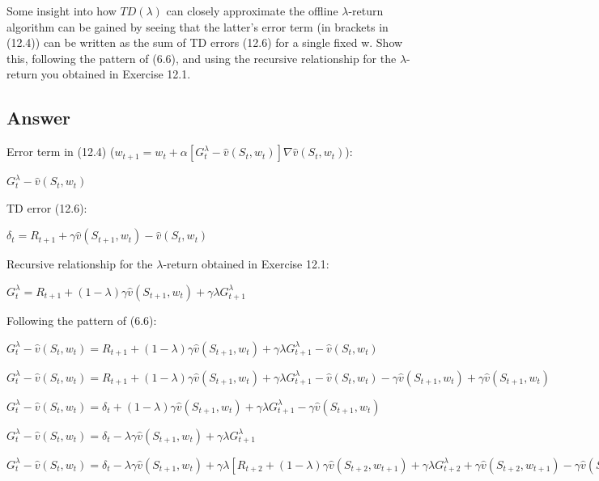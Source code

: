 \documentclass[11pt]{article}
\begin{document}
    Some insight into how $ TD(\lambda) $ can closely approximate the offline $\lambda$-return algorithm can be gained by seeing that the latter’s error term (in brackets in (12.4)) can be written as the sum of TD errors (12.6) for a single fixed w.
    Show this, following the pattern of (6.6), and using the recursive relationship for the $\lambda$-return you obtained in Exercise 12.1.

    \subsection*{Answer}

    \noindent Error term in (12.4) ($ w_{t+1} = w_t + \alpha [G_{t}^{\lambda} - \hat{v}(S_t, w_t)]\nabla \hat{v}(S_t, w_t)  $):

    \noindent $ G_{t}^{\lambda} - \hat{v}(S_t, w_t) $

    \hfill \break
    \noindent TD error (12.6):

    \noindent $ \delta_t = R_{t+1} + \gamma \hat{v}(S_{t+1}, w_t) - \hat{v}(S_t,w_t) $

    \hfill \break
    \noindent Recursive relationship for the $\lambda$-return obtained in Exercise 12.1:

    \noindent $ G_{t}^\lambda =  R_{t+1} + (1-\lambda) \gamma \hat{v}(S_{t+1},w_{t}) +  \gamma \lambda G_{t+1}^\lambda $

    \hfill \break
    \noindent Following the pattern of (6.6):

    \noindent $ G_{t}^{\lambda} - \hat{v}(S_t, w_t) = R_{t+1} + (1-\lambda) \gamma \hat{v}(S_{t+1},w_{t}) +  \gamma \lambda G_{t+1}^\lambda - \hat{v}(S_t, w_t) $

    \noindent $ G_{t}^{\lambda} - \hat{v}(S_t, w_t) = R_{t+1}  + (1-\lambda) \gamma \hat{v}(S_{t+1},w_{t}) +  \gamma \lambda G_{t+1}^\lambda - \hat{v}(S_t, w_t) - \gamma \hat{v}(S_{t+1}, w_t) + \gamma \hat{v}(S_{t+1}, w_t) $

    \noindent $ G_{t}^{\lambda} - \hat{v}(S_t, w_t) = \delta_{t} + (1-\lambda) \gamma \hat{v}(S_{t+1},w_{t}) +  \gamma \lambda G_{t+1}^\lambda - \gamma \hat{v}(S_{t+1}, w_t) $

    \noindent $ G_{t}^{\lambda} - \hat{v}(S_t, w_t) = \delta_{t} -\lambda \gamma \hat{v}(S_{t+1},w_{t}) +  \gamma \lambda G_{t+1}^\lambda $

    \noindent $ G_{t}^{\lambda} - \hat{v}(S_t, w_t) = \delta_{t} -\lambda \gamma \hat{v}(S_{t+1},w_{t}) +  \gamma \lambda [R_{t+2} + (1-\lambda) \gamma \hat{v}(S_{t+2},w_{t+1}) +  \gamma \lambda G_{t+2}^\lambda + \gamma \hat{v}(S_{t+2},w_{t+1}) - \gamma \hat{v}(S_{t+2},w_{t+1})] $
\end{document}
